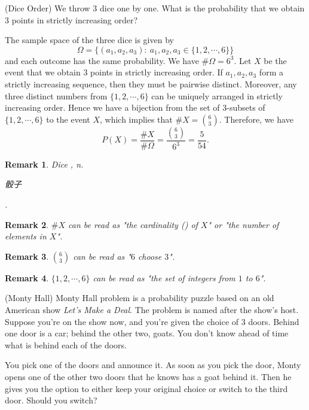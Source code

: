 \documentclass[12pt,letterpaper, onecolumn]{exam}
\newtheorem{remark}{Remark}
\begin{document}
\begin{questions}
\question[](Dice Order) We throw $3$ dice one by one. What is the probability that we obtain $3$ points in strictly increasing order?
\begin{solution}
    The sample space of the three dice is given by 
    $$\Omega=\{(a_1,a_2,a_3):\ a_1,a_2,a_3\in\{1,2,\cdots,6\}\}$$
    and each outcome has the same probability. We have $\#\Omega=6^3$. Let $X$ be the event that we obtain $3$ points in strictly increasing order. If $a_1,a_2,a_3$ form a strictly increasing sequence, then they must be pairwise distinct. Moreover, any three distinct numbers from $\{1,2,\cdots,6\}$ can be uniquely arranged in strictly increasing order. Hence we have a bijection from the set of $3$-subsets of $\{1,2,\cdots,6\}$ to the event $X$, which implies that $\# X=\binom{6}{3}$. Therefore, we have
    $$P(X)=\frac{\# X}{\#\Omega}=\frac{\binom{6}{3}}{6^3}=\frac{5}{54}.$$
\end{solution}
\begin{remark}
    Dice , n. \begin{CJK}{UTF8}{gbsn}骰子\end{CJK}.
\end{remark}
\begin{remark}
    $\# X$ can be read as "the cardinality () of $X$" or "the number of elements in $X$".
\end{remark}
\begin{remark}
    $\binom{6}{3}$ can be read as "$6$ choose $3$".
\end{remark}
\begin{remark}
    $\{1,2,\cdots,6\}$ can be read as "the set of integers from $1$ to $6$".
\end{remark}

\question[](Monty Hall) Monty Hall problem is a probability puzzle based on an old American show \textit{Let's Make a Deal}. The problem is named after the show’s host. Suppose you're on the show now, and you're given the choice of $3$ doors. Behind one door is a car; behind the other two, goats. You don’t know ahead of time what is behind each of the doors.

\quad You pick one of the doors and announce it. As soon as you pick the door, Monty opens one of the other two doors that he knows has a goat behind it. Then he gives you the option to either keep your original choice or switch to the third door. Should you switch?


\end{questions}
\end{document}
